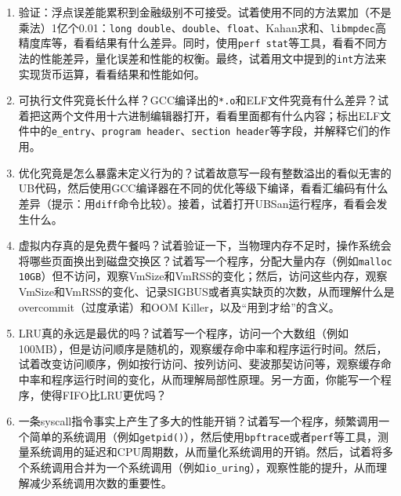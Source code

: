 \begin{thinking}
  \begin{enumerate}
    \item 验证：浮点误差能累积到金融级别不可接受。试着使用不同的方法累加（不是乘法）1亿个0.01：\texttt{long double}、\texttt{double}、\texttt{float}、Kahan求和、\texttt{libmpdec}高精度库等，看看结果有什么差异。同时，使用\texttt{perf stat}等工具，看看不同方法的性能差异，量化误差和性能的权衡。最终，试着用文中提到的\texttt{int}方法来实现货币运算，看看结果和性能如何。
    \item 可执行文件究竟长什么样？GCC编译出的\texttt{*.o}和ELF文件究竟有什么差异？试着把这两个文件用十六进制编辑器打开，看看里面都有什么内容；标出ELF文件中的\texttt{e\_entry}、\texttt{program header}、\texttt{section header}等字段，并解释它们的作用。
    \item 优化究竟是怎么暴露未定义行为的？试着故意写一段有整数溢出的看似无害的UB代码，然后使用GCC编译器在不同的优化等级下编译，看看汇编码有什么差异（提示：用\texttt{diff}命令比较）。接着，试着打开UBSan运行程序，看看会发生什么。
    \item 虚拟内存真的是免费午餐吗？试着验证一下，当物理内存不足时，操作系统会将哪些页面换出到磁盘交换区？试着写一个程序，分配大量内存（例如\texttt{malloc 10GB}）但不访问，观察VmSize和VmRSS的变化；然后，访问这些内存，观察VmSize和VmRSS的变化、记录SIGBUS或者真实缺页的次数，从而理解什么是overcommit（过度承诺）和OOM Killer，以及“用到才给”的含义。
    \item LRU真的永远是最优的吗？试着写一个程序，访问一个大数组（例如100MB），但是访问顺序是随机的，观察缓存命中率和程序运行时间。然后，试着改变访问顺序，例如按行访问、按列访问、斐波那契访问等，观察缓存命中率和程序运行时间的变化，从而理解局部性原理。另一方面，你能写一个程序，使得FIFO比LRU更优吗？
    \item 一条syscall指令事实上产生了多大的性能开销？试着写一个程序，频繁调用一个简单的系统调用（例如\texttt{getpid()}），然后使用\texttt{bpftrace}或者\texttt{perf}等工具，测量系统调用的延迟和CPU周期数，从而量化系统调用的开销。然后，试着将多个系统调用合并为一个系统调用（例如\texttt{io\_uring}），观察性能的提升，从而理解减少系统调用次数的重要性。
  \end{enumerate}
\end{thinking}
